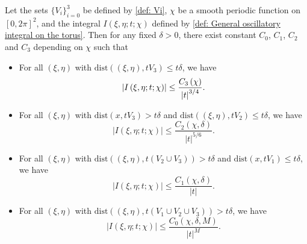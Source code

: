 \documentclass[10pt,a4paper]{amsart}
\begin{document}
\begin{theorem}\label{theorem: POU+decay}
    Let the sets $\{V_{i}\}_{i=0}^{3}$ be defined by \eqref{def: Vi}, $\chi$ be a smooth periodic function on $\left[0,2\pi\right]^{2}$, and the integral $I\left(\xi,\eta;t;\chi\right)$ defined by \eqref{def: General oscillatory integral on the torus}. Then for any fixed $\delta>0$, there exist constant $C_{0}$, $C_{1}$, $C_{2}$ and $C_{3}$ depending on $\chi$ such that
    \begin{itemize}
        \item For all $\left(\xi,\eta\right)$ with $\mathrm{dist}\left(\left(\xi,\eta\right),tV_{3}\right)\leq t\delta$, we have
            \begin{equation}\label{eq:A_{3} decay}
                \left|I\left(\xi,\eta;t;\chi\right)\right|\leq\frac{C_{3}\left(\chi\right)}{\left|t\right|^{3/4}}.
            \end{equation}
        \item For all $\left(\xi,\eta\right)$ with $\mathrm{dist}\left(x,tV_{3}\right)>t\delta$ and $\mathrm{dist}\left(\left(\xi,\eta\right),tV_{2}\right)\leq t\delta$, we have
            \begin{equation}
                \left|I\left(\xi,\eta;t;\chi\right)\right|\leq\frac{C_{2}\left(\chi,\delta\right)}{\left|t\right|^{5/6}}.
            \end{equation}
        \item For all $\left(\xi,\eta\right)$ with $\mathrm{dist}\left(\left(\xi,\eta\right),t\left(V_{2}\cup V_{3}\right)\right)> t\delta$ and $\mathrm{dist}\left(x,tV_{1}\right)\leq t\delta$, we have
            \begin{equation}
                \left|I\left(\xi,\eta;t;\chi\right)\right|\leq\frac{C_{1}\left(\chi,\delta\right)}{\left|t\right|}.
            \end{equation}
        \item For all $\left(\xi,\eta\right)$ with $\mathrm{dist}\left(\left(\xi,\eta\right),t\left(V_{1}\cup V_{2}\cup V_{3}\right)\right)>t\delta$, we have
            \begin{equation}
                \left|I\left(\xi,\eta;t;\chi\right)\right|\leq\frac{C_{0}\left(\chi,\delta,M\right)}{\left|t\right|^{M}}.
            \end{equation}
    \end{itemize}
\end{theorem}
\end{document}
